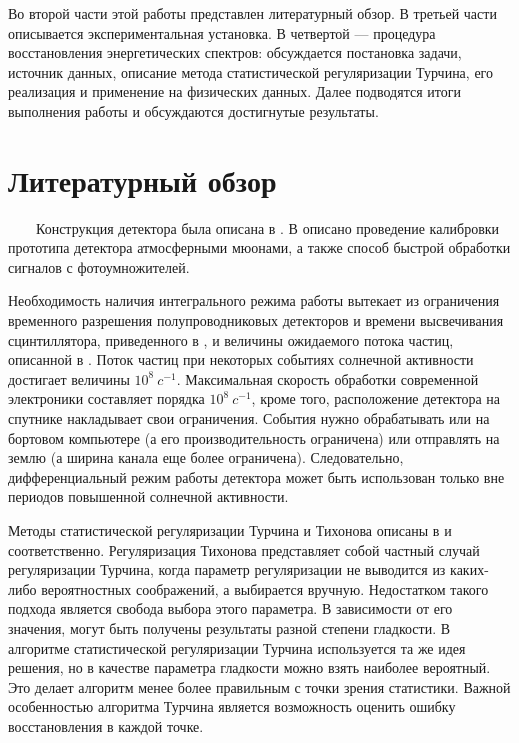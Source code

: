\documentclass{config}
\begin{document}
Во второй части этой работы представлен литературный обзор. В третьей части описывается экспериментальная установка. В четвертой — процедура восстановления энергетических спектров: обсуждается постановка задачи, источник данных, описание метода статистической регуляризации Турчина, его реализация и применение на физических данных. Далее подводятся итоги выполнения работы и обсуждаются достигнутые результаты.

\newpage


\section{Литературный обзор}

~~~~Конструкция детектора была описана в \cite{detector_construction, our_article, detector_construction2}. В \cite{our_article} описано проведение калибровки прототипа детектора атмосферными мюонами, а также способ быстрой обработки сигналов с фотоумножителей.

Необходимость наличия интегрального режима работы вытекает из ограничения временного разрешения полупроводниковых детекторов и времени высвечивания сцинтиллятора, приведенного в \cite{grupen}, и величины ожидаемого потока частиц, описанной в \cite{real_energy_spectrum}. Поток частиц при некоторых событиях солнечной активности достигает величины $10^8~c^{-1}$. Максимальная скорость обработки современной электроники составляет порядка $10^8~c^{-1}$, кроме того, расположение детектора на спутнике накладывает свои ограничения. События нужно обрабатывать или на бортовом компьютере (а его производительность ограничена) или отправлять на землю (а ширина канала еще более ограничена). Следовательно, дифференциальный режим работы детектора может быть использован только вне периодов повышенной солнечной активности.

Методы статистической регуляризации Турчина и Тихонова описаны в \cite{turchin} и \cite{tikhonov} соответственно. Регуляризация Тихонова представляет собой частный случай регуляризации Турчина, когда параметр регуляризации не выводится из каких-либо вероятностных соображений, а выбирается вручную. Недостатком такого подхода является свобода выбора этого параметра. В зависимости от его значения, могут быть получены результаты разной степени гладкости. В алгоритме статистической регуляризации Турчина используется та же идея решения, но в качестве параметра гладкости можно взять наиболее вероятный. Это делает алгоритм менее более правильным с точки зрения статистики. Важной особенностью алгоритма Турчина является возможность оценить ошибку восстановления в каждой точке.
\end{document}
